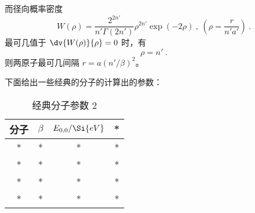 而径向概率密度
\begin{equation}
W(\rho) = \frac{2^{2n'}}{n' \Gamma{(2n')}} \rho^{2n'} \exp(-2\rho) ~, \ \left(\rho = \frac{r}{n'a'}\right) ~.
\end{equation}
最可几值于 $\dv{W(\rho)}{\rho} = 0$ 时，有
\begin{equation}
\rho = n' ~.
\end{equation}
则两原子最可几间隔 $r = a (n'/\beta)^2$。

下面给出一些经典的分子的计算出的参数：
\begin{table}[ht]
\centering
\caption{经典分子参数 2}\label{tab_kratPo2}
\begin{tabular}{|c|c|c|c|}
\hline
分子 & $\beta$ & $E_{0,0} / \Si{eV}$ & * \\
\hline
* & * & * & * \\
\hline
* & * & * & * \\
\hline
* & * & * & * \\
\hline
* & * & * & * \\
\hline
\end{tabular}
\end{table}
